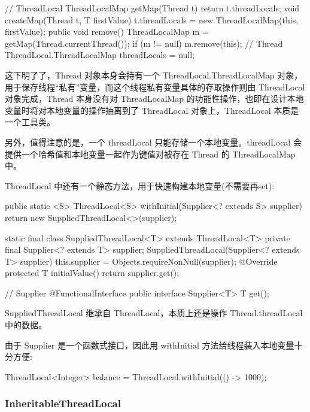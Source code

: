 \begin{Java}
// ThreadLocal
ThreadLocalMap getMap(Thread t) {
    return t.threadLocals;
}
void createMap(Thread t, T firstValue) {
    t.threadLocals = new ThreadLocalMap(this, firstValue);
}
public void remove() {
    ThreadLocalMap m = getMap(Thread.currentThread());
    if (m != null) {
        m.remove(this);
    }
}
// Thread
ThreadLocal.ThreadLocalMap threadLocals = null;
\end{Java}

这下明了了，Thread 对象本身会持有一个 ThreadLocal.ThreadLocalMap 对象，用于保存线程``私有''变量，而这个线程私有变量具体的存取操作则由 ThreadLocal 对象完成，Thread 本身没有对 ThreadLocalMap 的功能性操作，也即在设计本地变量时将对本地变量的操作抽离到了 ThreadLocal 对象上，ThreadLocal 本质是一个工具类。

另外，值得注意的是，一个 threadLocal 只能存储一个本地变量。threadLocal 会提供一个哈希值和本地变量一起作为键值对被存在 Thread 的 ThreadLocalMap 中。

ThreadLocal 中还有一个静态方法，用于快速构建本地变量(不需要再set):

\begin{Java}
public static <S> ThreadLocal<S> withInitial(Supplier<? extends S> supplier) {
    return new SuppliedThreadLocal<>(supplier);
}

static final class SuppliedThreadLocal<T> extends ThreadLocal<T> {
    private final Supplier<? extends T> supplier;
    SuppliedThreadLocal(Supplier<? extends T> supplier) {
        this.supplier = Objects.requireNonNull(supplier);
    }
    @Override
    protected T initialValue() {
        return supplier.get();
    }
}

// Supplier 
@FunctionalInterface
public interface Supplier<T> {
    T get();
}
\end{Java}

SuppliedThreadLocal 继承自 ThreadLocal，本质上还是操作 Thread.threadLocal 中的数据。

由于 Supplier 是一个函数式接口，因此用 withInitial 方法给线程装入本地变量十分方便:

\begin{Java}
ThreadLocal<Integer> balance = ThreadLocal.withInitial(() -> 1000);
\end{Java}

\subsubsection{InheritableThreadLocal}

